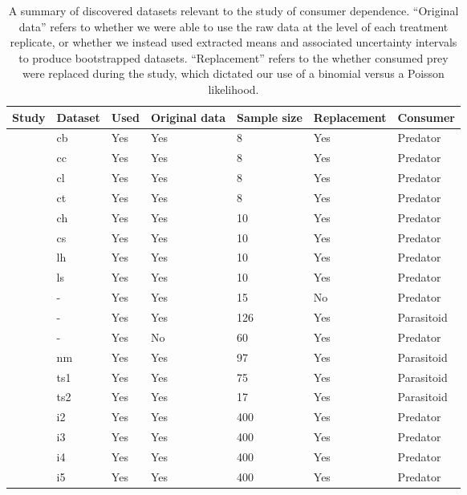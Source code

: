 \begin{table}[!tbp]
\caption{A summary of discovered datasets relevant to the study of consumer dependence.  ``Original data'' refers to whether we were able to use the raw data at the level of each treatment replicate, or whether we instead used extracted means and associated uncertainty intervals to produce bootstrapped datasets. ``Replacement'' refers to the whether consumed prey were replaced during the study, which dictated our use of a binomial versus a Poisson likelihood. \label{table:datasets}} 
\begin{center}
\begin{tabular}{lllllll}
\hline\hline
\multicolumn{1}{c}{Study}&\multicolumn{1}{c}{Dataset}&\multicolumn{1}{c}{Used}&\multicolumn{1}{c}{Original data}&\multicolumn{1}{c}{Sample size}&\multicolumn{1}{c}{Replacement}&\multicolumn{1}{c}{Consumer}\tabularnewline
\hline
\citet{Blowes:2017aa}&cb&Yes&Yes&8&Yes&Predator\tabularnewline
\citet{Blowes:2017aa}&cc&Yes&Yes&8&Yes&Predator\tabularnewline
\citet{Blowes:2017aa}&cl&Yes&Yes&8&Yes&Predator\tabularnewline
\citet{Blowes:2017aa}&ct&Yes&Yes&8&Yes&Predator\tabularnewline
\citet{Chan:2017aa}&ch&Yes&Yes&10&Yes&Predator\tabularnewline
\citet{Chan:2017aa}&cs&Yes&Yes&10&Yes&Predator\tabularnewline
\citet{Chan:2017aa}&lh&Yes&Yes&10&Yes&Predator\tabularnewline
\citet{Chan:2017aa}&ls&Yes&Yes&10&Yes&Predator\tabularnewline
\citet{Chant:1966aa}&-&Yes&Yes&15&No&Predator\tabularnewline
\citet{Chong:2006aa}&-&Yes&Yes&126&Yes&Parasitoid\tabularnewline
\citet{Crowley:1989aa}&-&Yes&No&60&Yes&Predator\tabularnewline
\citet{Edwards:1961aa}&nm&Yes&Yes&97&Yes&Parasitoid\tabularnewline
\citet{Edwards:1961aa}&ts1&Yes&Yes&75&Yes&Parasitoid\tabularnewline
\citet{Edwards:1961aa}&ts2&Yes&Yes&17&Yes&Parasitoid\tabularnewline
\citet{Elliott:2005aa}&i2&Yes&Yes&400&Yes&Predator\tabularnewline
\citet{Elliott:2005aa}&i3&Yes&Yes&400&Yes&Predator\tabularnewline
\citet{Elliott:2005aa}&i4&Yes&Yes&400&Yes&Predator\tabularnewline
\citet{Elliott:2005aa}&i5&Yes&Yes&400&Yes&Predator\tabularnewline

\end{tabular}
\end{center}
\end{table}
